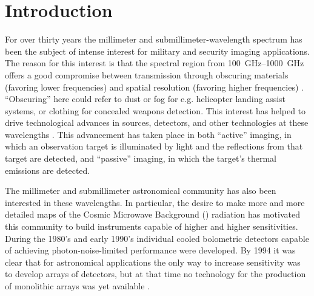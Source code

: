 \chapter{Introduction} \label{c:intro}



For over thirty years the millimeter and submillimeter-wavelength spectrum has been the subject of intense interest for military and security imaging applications.
The reason for this interest is that the spectral region from \SIrange{100}{1000}{\GHz} offers a good compromise between transmission through obscuring materials (favoring lower frequencies) and spatial resolution (favoring higher frequencies) \cite{kruse_why_1981}.
``Obscuring'' here could refer to dust or fog for e.g. helicopter landing assist systems, or clothing for concealed weapons detection.
This interest has helped to drive technological advances in sources, detectors, and other technologies at these wavelengths \cite{popovic_thz_2011,rogalski_terahertz_2011,rieke_detection_2003}.
This advancement has taken place in both ``active'' imaging, in which an observation target is illuminated by light and the reflections from that target are detected, and ``passive'' imaging, in which the target's thermal emissions are detected.

The millimeter and submillimeter astronomical community has also been interested in these wavelengths.
In particular, the desire to make more and more detailed maps of the Cosmic Microwave Background (\CMB) radiation has motivated this community to build instruments capable of higher and higher sensitivities.
During the 1980's and early 1990's individual cooled bolometric detectors capable of achieving photon-noise-limited performance were developed.
By 1994 it was clear that for astronomical applications the only way to increase sensitivity was to develop arrays of detectors, but at that time no technology for the production of monolithic arrays was yet available \cite{richards_bolometers_1994}.

